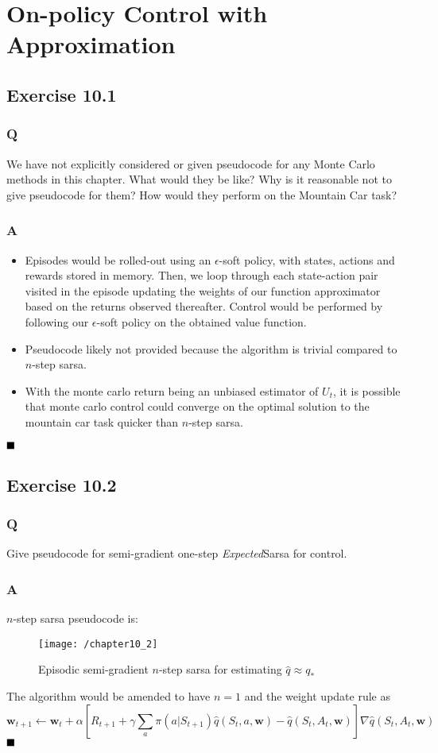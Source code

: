  \section{On-policy Control with Approximation}
\subsection{Exercise 10.1}
\subsubsection{Q}
We have not explicitly considered or given pseudocode for any Monte Carlo methods in this chapter. What would they be like? Why is it reasonable not to give pseudocode for them? How would they perform on the Mountain Car task?
\subsubsection{A}
\begin{itemize}
\item Episodes would be rolled-out using an $\epsilon$-soft policy, with states, actions and rewards stored in memory. Then, we loop through each state-action pair visited in the episode updating the weights of our function approximator based on the returns observed thereafter. Control would be performed by following our $\epsilon$-soft policy on the obtained value function. 
\item Pseudocode likely not provided because the algorithm is trivial compared to $n$-step sarsa. 
\item With the monte carlo return being an unbiased estimator of $U_t$, it is possible that monte carlo control could converge on the optimal solution to the mountain car task quicker than $n$-step sarsa.
\end{itemize}

$
\hfill \blacksquare
$

\subsection{Exercise 10.2}
\subsubsection{Q}
Give pseudocode for semi-gradient one-step \textit{Expected}Sarsa for control. 
\subsubsection{A}
$n$-step sarsa pseudocode is:
\begin{figure}[h!]
	\centering
	\texttt{[image: /chapter10\_2]}
	\caption{Episodic semi-gradient $n$-step sarsa for estimating $\hat{q} \approx q_*$}
	\label{fig: 10_2}
\end{figure}
The algorithm would be amended to have $n = 1$ and the weight update rule as
\begin{equation}
\textbf{w}_{t+1} \leftarrow \textbf{w}_{t} + \alpha \left[R_{t+1} + \gamma\sum_{a} \pi(a | S_{t+1})\hat{q}(S_t, a, \textbf{w})  - \hat{q}(S_t, A_t, \textbf{w})\right] \nabla \hat{q}(S_t, A_t, \textbf{w})
\end{equation}
$
\hfill \blacksquare
$

